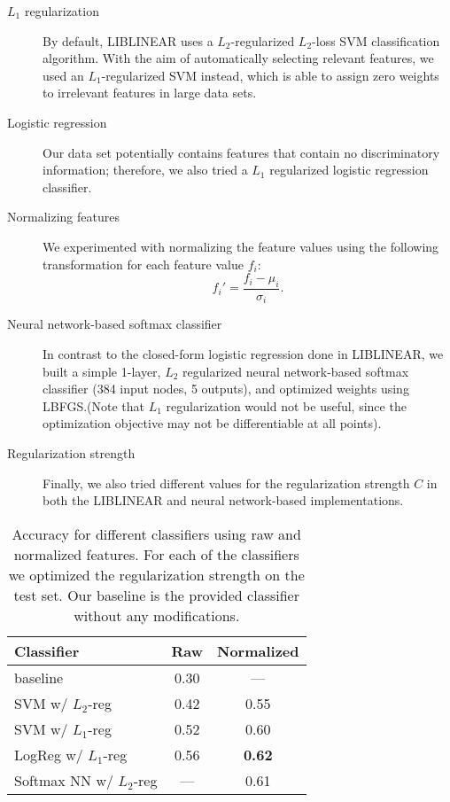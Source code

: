 \documentclass[twocolumn, 11pt]{article}
\begin{document}
\begin{description}

  \item[$L_1$ regularization] By default, LIBLINEAR uses a $L_2$-regularized
  $L_2$-loss SVM classification algorithm.  With the aim of automatically
  selecting relevant features, we used an $L_1$-regularized SVM instead, which
  is able to assign zero weights to irrelevant features in large data sets.

  \item[Logistic regression] Our data set potentially contains features that
  contain no discriminatory information; therefore, we also tried a $L_1$
  regularized logistic regression classifier.

  \item[Normalizing features] We experimented with normalizing the feature
  values using the following transformation for each feature value $f_i$:
  \[f_i' = \frac{f_i - \mu_i}{\sigma_i}.\]

  \item[Neural network-based softmax classifier] In contrast to the closed-form
  logistic regression done in LIBLINEAR, we built a simple 1-layer, $L_2$
  regularized neural network-based softmax classifier (384 input nodes, 5
  outputs), and optimized weights using LBFGS.\@ (Note that $L_1$ regularization
  would not be useful, since the optimization objective may not be
  differentiable at all points).

  \item[Regularization strength] Finally, we also tried different values for
  the regularization strength $C$ in both the LIBLINEAR and neural
  network-based implementations.

\end{description}

\begin{table}[b]\centering
  \begin{tabular}{lcc}
    \toprule
    Classifier & Raw  & Normalized \\
    \midrule
    baseline & 0.30& ---\\
    SVM w/ $L_2$-reg & 0.42 & 0.55 \\
    SVM w/ $L_1$-reg & 0.52 & 0.60 \\
    LogReg w/ $L_1$-reg & 0.56 & \textbf{0.62}  \\
    Softmax NN w/ $L_2$-reg & --- & 0.61  \\ %
    \bottomrule
  \end{tabular}
  \caption{\footnotesize Accuracy for different classifiers using raw and normalized
  features. For each of the classifiers we optimized the regularization strength on the
  test set. Our baseline is the provided classifier without any modifications.}\label{tab:results}
\end{table}
\end{document}

